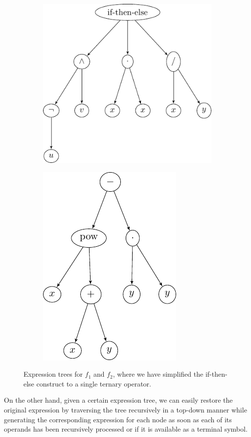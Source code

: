 \begin{figure}
	\begin{subfigure}{0.59\textwidth}
		\includegraphics{figures/trees/gp_expression_tree1.pdf}
	\end{subfigure}
	\begin{subfigure}{0.41\textwidth}
		\includegraphics{figures/trees/gp_expression_tree2.pdf}
	\end{subfigure}
 \caption{Expression trees for $f_1$ and $f_2$, where we have simplified the if-then-else construct to a single ternary operator.}
 \label{fig:gp-expression-tree-examples}
\end{figure}
On the other hand, given a certain expression tree, we can easily restore the original expression by traversing the tree recursively in a top-down manner while generating the corresponding expression for each node as soon as each of its operands has been recursively processed or if it is available as a terminal symbol.
